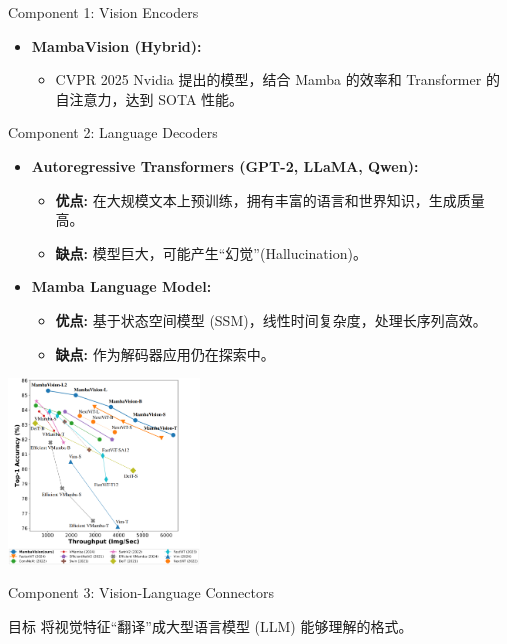 \documentclass{beamer}
\begin{document}
\begin{CJK}{UTF8}{gbsn}
\begin{frame}{Component 1: Vision Encoders}
\begin{itemize}
        \item \textbf{MambaVision (Hybrid):}
        \begin{itemize}
             \item CVPR 2025 Nvidia 提出的模型，结合 Mamba 的效率和 Transformer 的自注意力，达到 SOTA 性能。
        \end{itemize}
    \end{itemize}
\end{frame}

\begin{frame}{Component 2: Language Decoders}
    \begin{itemize}
        \item \textbf{Autoregressive Transformers (GPT-2, LLaMA, Qwen):}
        \begin{itemize}
            \item \textbf{优点:} 在大规模文本上预训练，拥有丰富的语言和世界知识，生成质量高。
            \item \textbf{缺点:} 模型巨大，可能产生“幻觉”(Hallucination)。
        \end{itemize}
        \medskip
        
        \item \textbf{Mamba Language Model:}
        \begin{itemize}
            \item \textbf{优点:} 基于状态空间模型 (SSM)，线性时间复杂度，处理长序列高效。
            \item \textbf{缺点:} 作为解码器应用仍在探索中。
        \end{itemize}
    \end{itemize}
    \vfill
    \begin{center}
        \includegraphics[width=0.38\textwidth]{images/mambavision_architecture.png}
    \end{center}
\end{frame}

\begin{frame}{Component 3: Vision-Language Connectors}
    \begin{block}{目标}
        将视觉特征“翻译”成大型语言模型 (LLM) 能够理解的格式。
    \end{block}
    

\end{frame}
\end{CJK}
\end{document}
